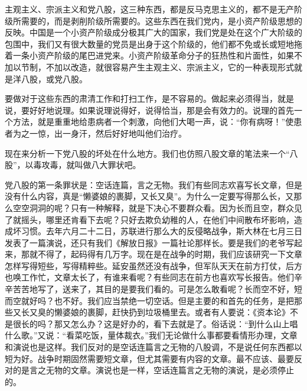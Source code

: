 主观主义、宗派主义和党八股，这三种东西，都是反马克思主义的，都不是无产阶级所需要的，而是剥削阶级所需要的。这些东西在我们党内，是小资产阶级思想的反映。中国是一个小资产阶级成分极其广大的国家，我们党是处在这个广大阶级的包围中，我们又有很大数量的党员是出身于这个阶级的，他们都不免或长或短地拖着一条小资产阶级的尾巴进党来。小资产阶级革命分子的狂热性和片面性，如果不加以节制，不加以改造，就很容易产生主观主义、宗派主义，它的一种表现形式就是洋八股，或党八股。

要做对于这些东西的肃清工作和打扫工作，是不容易的。做起来必须得当，就是说，要好好地说理。如果说理说得好，说得恰当，那是会有效力的。说理的首先一个方法，就是重重地给患病者一个刺激，向他们大喝一声，说：“你有病呀！”使患者为之一惊，出一身汗，然后好好地叫他们治疗。

现在来分析一下党八股的坏处在什么地方。我们也仿照八股文章的笔法来一个“八股”，以毒攻毒，就叫做八大罪状吧。

党八股的第一条罪状是：空话连篇，言之无物。我们有些同志欢喜写长文章，但是没有什么内容，真是“懒婆娘的裹脚，又长又臭”。为什么一定要写得那么长，又那么空空洞洞的呢？只有一种解释，就是下决心不要群众看。因为长而且空，群众见了就摇头，哪里还肯看下去呢？只好去欺负幼稚的人，在他们中间散布坏影响，造成坏习惯。去年六月二十二日，苏联进行那么大的反侵略战争，斯大林在七月三日发表了一篇演说，还只有我们《解放日报》一篇社论那样长。要是我们的老爷写起来，那就不得了，起码得有几万字。现在是在战争的时期，我们应该研究一下文章怎样写得短些，写得精粹些。延安虽然还没有战争，但军队天天在前方打仗，后方也唤工作忙，文章太长了，有谁来看呢？有些同志在前方也喜欢写长报告。他们辛辛苦苦地写了，送来了，其目的是要我们看的。可是怎么敢看呢？长而空不好，短而空就好吗？也不好。我们应当禁绝一切空话。但是主要的和首先的任务，是把那些又长又臭的懒婆娘的裹脚，赶快扔到垃圾桶里去。或者有人要说：《资本论》不是很长的吗？那又怎么办？这是好办的，看下去就是了。俗话说：“到什么山上唱什么歌。”又说：“看菜吃饭，量体裁衣。”我们无论做什么事都要看情形办理，文章和演说也是这样。我们反对的是空话连篇言之无物的八股调，不是说任何东西都以短为好。战争时期固然需要短文章，但尤其需要有内容的文章。最不应该、最要反对的是言之无物的文章。演说也是一样，空话连篇言之无物的演说，是必须停止的。

